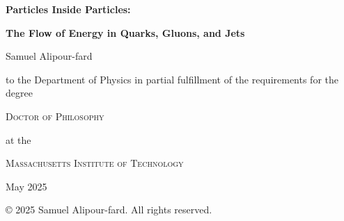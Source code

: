 \begin{center}
    {\LARGE \textbf{Particles Inside Particles:} }

    \vspace{10pt}

    {\LARGE \textbf{The Flow of Energy in Quarks, Gluons, and Jets} }

    \Large

    \vspace{20pt}

    \vspace{-30pt}
    \begin{flushright}
        Samuel Alipour-fard
    \end{flushright}

    \vspace{10pt}

    {\large to the Department of Physics in partial fulfillment of the requirements for the degree}

    \vspace{20pt}

    \textsc{Doctor of Philosophy}  %

    \vspace{5pt}

    at the

    \vspace{10pt}

    \textsc{Massachusetts Institute of Technology}  %

    \vspace{10pt}

    May 2025


    \vspace{10pt}

    {\large \copyright{} 2025 Samuel Alipour-fard. All rights reserved.}
\end{center}
